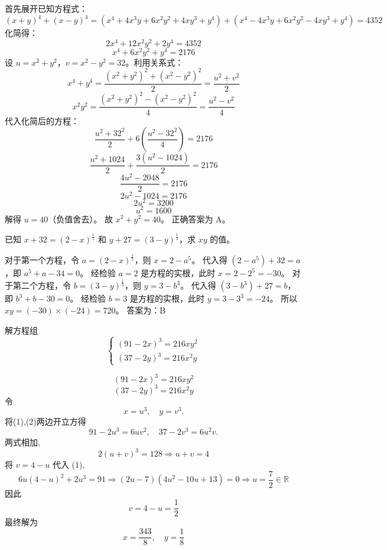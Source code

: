 \begin{questions}
\begin{solution}
首先展开已知方程式：
\[ (x+y)^4 + (x-y)^4 = (x^4 + 4x^3y + 6x^2y^2 + 4xy^3 + y^4) + (x^4 - 4x^3y + 6x^2y^2 - 4xy^3 + y^4) = 4352 \]
化简得：
\[ 2x^4 + 12x^2y^2 + 2y^4 = 4352 \]
\[ x^4 + 6x^2y^2 + y^4 = 2176 \]
设 $u = x^2 + y^2$，$v = x^2 - y^2 = 32$。利用关系式：
\[ x^4 + y^4 = \frac{(x^2+y^2)^2 + (x^2-y^2)^2}{2} = \frac{u^2 + v^2}{2} \]
\[ x^2y^2 = \frac{(x^2+y^2)^2 - (x^2-y^2)^2}{4} = \frac{u^2 - v^2}{4} \]
代入化简后的方程：
\[ \frac{u^2 + 32^2}{2} + 6 \left( \frac{u^2 - 32^2}{4} \right) = 2176 \]
\[ \frac{u^2 + 1024}{2} + \frac{3(u^2 - 1024)}{2} = 2176 \]
\[ \frac{4u^2 - 2048}{2} = 2176 \]
\[ 2u^2 - 1024 = 2176 \]
\[ 2u^2 = 3200 \]
\[ u^2 = 1600 \]
解得 $u = 40$（负值舍去）。
故 $x^2 + y^2 = 40$。
正确答案为 A。
\end{solution}
\question 已知 $x + 32 = (2 - x)^{\frac{1}{5}}$ 和 $y + 27 = (3 - y)^{\frac{1}{3}}$，求 $xy$ 的值。

\begin{solution}
对于第一个方程，令 $a = (2 - x)^{\frac{1}{5}}$，则 $x = 2 - a^{5}$。
代入得 $(2 - a^{5}) + 32 = a$，即 $a^{5} + a - 34 = 0$。
经检验 $a = 2$ 是方程的实根，此时 $x = 2 - 2^{5} = -30$。
对于第二个方程，令 $b = (3 - y)^{\frac{1}{3}}$，则 $y = 3 - b^{3}$。
代入得 $(3 - b^{3}) + 27 = b$，即 $b^{3} + b - 30 = 0$。
经检验 $b = 3$ 是方程的实根，此时 $y = 3 - 3^{3} = -24$。
所以 $xy = (-30) \times (-24) = 720$。
答案为：B
\end{solution}
    \question 解方程组
    \[
    \begin{cases}
    (91-2x)^{3}=216xy^{2} \\
    (37-2y)^{3}=216x^{2}y
    \end{cases}
    \]
    \begin{solution}
        \[
        (91-2x)^{3}=216xy^{2} \tag{1}
        \]
        \[
        (37-2y)^{3}=216x^{2}y \tag{2}
        \]
        令
        \[
        x = u^3, \quad y = v^3.
        \]
        将(1),(2)两边开立方得
        \[
        91-2u^3 = 6 u v^2, \quad 37-2v^3 = 6 u^2 v.
        \]
        两式相加,
        \[
        2(u+v)^3=128 \Rightarrow u+v=4
        \]
        将 $v = 4-u$ 代入 (1),
        \[
        6 u (4-u)^2 + 2 u^3 = 91 \Rightarrow (2 u - 7) (4 u^2 - 10 u + 13)=0 \Rightarrow u=\frac{7}{2} \in \mathbb{R}
        \]
        因此
        \[
        v = 4 - u = \frac{1}{2}
        \]
        最终解为
        \[
        x = \frac{343}{8}, \quad y = \frac{1}{8}
        \]
    \end{solution}


\end{questions}
